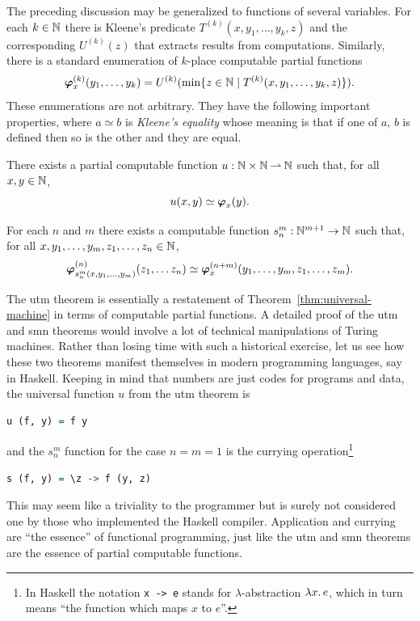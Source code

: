 The preceding discussion may be generalized to functions of several
variables. For each $k \in \mathbb{N}$ there is Kleene's predicate
$T^{(k)}(x,y_1,\ldots,y_k,z)$ and the corresponding $U^{(k)}(z)$ that
extracts results from computations. Similarly, there is a standard
enumeration of $k$-place computable partial functions
%
\begin{equation*}
  \text{\boldmath{$\varphi$}}^{(k)}_{x}(y_1, \ldots, y_k) =
  U^{(k)}(\min \{z \in \mathbb{N} \mid T^{(k)}(x,y_1, \ldots, y_k,z)\}).
\end{equation*}
%
These enumerations are not arbitrary. They have the following
important properties, where $a \simeq b$ is \emph{Kleene's equality}
whose meaning is that if one of $a$, $b$ is defined then so is the
other and they are equal.

\begin{theorem}[utm]
  There exists a partial computable function $u : \mathbb{N} \times
  \mathbb{N} \mathbin{\rightharpoonup} \mathbb{N}$ such that, for all $x, y \in \mathbb{N}$,
  \begin{equation*}
    u(x,y) \simeq \text{\boldmath{$\varphi$}}_{x}(y).
  \end{equation*}
\end{theorem}

\begin{theorem}[smn]
  For each $n$ and $m$ there exists a computable function $s_n^m :
  \mathbb{N}^{m+1} \to \mathbb{N}$ such that, for all $x, y_1, \ldots, y_m, z_1,
  \ldots, z_n \in \mathbb{N}$,
  \begin{equation*}
    \text{\boldmath{$\varphi$}}^{(n)}_{s_n^m(x,y_1, \ldots, y_m)}(z_1, \ldots z_n) \simeq
    \text{\boldmath{$\varphi$}}^{(n+m)}_{x}(y_1, \ldots, y_m, z_1, \ldots, z_m).
  \end{equation*}
\end{theorem}

\noindent
The utm theorem is essentially a restatement of
Theorem~\ref{thm:universal-machine} in terms of computable partial
functions. A detailed proof of the utm and smn theorems would involve
a lot of technical manipulations of Turing machines. Rather than
losing time with such a historical exercise, let us see how these two
theorems manifest themselves in modern programming languages, say in
Haskell. Keeping in mind that numbers are just codes for programs and
data, the universal function $u$ from the utm theorem is
%
\begin{lstlisting}[language=Haskell]
  u (f, y) = f y
\end{lstlisting}
%
and the $s_n^m$ function for the case $n = m = 1$ is the currying
operation\footnote{In Haskell the notation \texttt{{}x -> e}
  stands for $\lambda$-abstraction $\lambda x .\,e$, which in turn means
  ``the function which maps $x$ to $e$''.}
%
\begin{lstlisting}[language=Haskell]
  s (f, y) = \z -> f (y, z)
\end{lstlisting}
%
This may seem like a triviality to the programmer but is surely not
considered one by those who implemented the Haskell compiler.
Application and currying are ``the essence'' of functional
programming, just like the utm and smn theorems are the essence of
partial computable functions.

